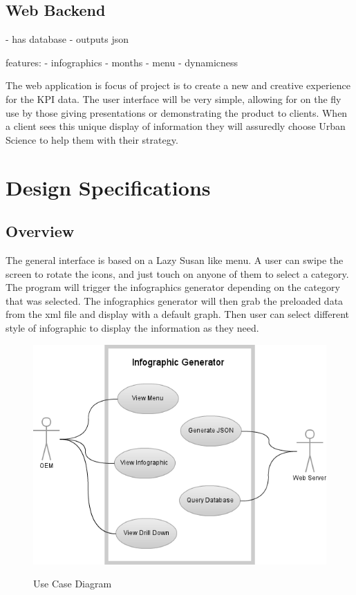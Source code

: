 \documentclass[11pt,a4paper,oneside]{article}
\begin{document}
\subsection {Web Backend}
 - has database
 - outputs json



features: 
   - infographics
   - months
   - menu
   - dynamicness


The web application is focus of project is to create a new and creative experience for the KPI data. The user interface will be very simple, allowing for on the fly use by those giving presentations or demonstrating the product to clients. When a client sees this unique display of information they will assuredly choose Urban Science to help them with their strategy.\\




\section{Design Specifications}

\subsection{Overview}

The general interface is based on a Lazy Susan like menu. A user can swipe the screen to rotate the icons, and just touch on anyone of them to select a category. The program will trigger the infographics generator depending on the category that was selected. The infographics generator will then grab the preloaded data from the xml file and display with a default graph. Then user can select different style of infographic to display the information as they need.\\

\begin{figure}[!]
\caption{Use Case Diagram}
\includegraphics[width=1\textwidth]{images/Capstone_-_Use_Case_Diagram.png}\\   
\end{figure}
\end{document}
